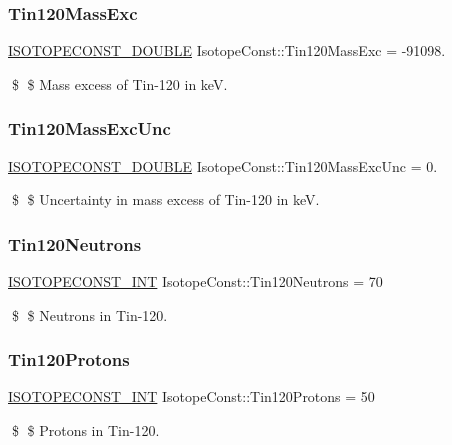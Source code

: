 \subsubsection{\texorpdfstring{Tin120\+Mass\+Exc}{Tin120MassExc}}
{\footnotesize\ttfamily \mbox{\hyperlink{group___isotope_const-_macros_ga8f45a7272ce02c0b4c65c44636ed719a}{I\+S\+O\+T\+O\+P\+E\+C\+O\+N\+S\+T\+\_\+\+D\+O\+U\+B\+LE}} Isotope\+Const\+::\+Tin120\+Mass\+Exc = -\/91098.}

\$ \$ Mass excess of Tin-\/120 in keV. \mbox{\label{group___isotope_const-_tin-_sn120_ga3a619c52223905068be133a5ba8a5cce}} 
\subsubsection{\texorpdfstring{Tin120\+Mass\+Exc\+Unc}{Tin120MassExcUnc}}
{\footnotesize\ttfamily \mbox{\hyperlink{group___isotope_const-_macros_ga8f45a7272ce02c0b4c65c44636ed719a}{I\+S\+O\+T\+O\+P\+E\+C\+O\+N\+S\+T\+\_\+\+D\+O\+U\+B\+LE}} Isotope\+Const\+::\+Tin120\+Mass\+Exc\+Unc = 0.}

\$ \$ Uncertainty in mass excess of Tin-\/120 in keV. \mbox{\label{group___isotope_const-_tin-_sn120_ga36d9ff5de2eb9184aceeff30debefafb}} 
\subsubsection{\texorpdfstring{Tin120\+Neutrons}{Tin120Neutrons}}
{\footnotesize\ttfamily \mbox{\hyperlink{group___isotope_const-_macros_ga5f18360b3e99483a35c32d789e62621c}{I\+S\+O\+T\+O\+P\+E\+C\+O\+N\+S\+T\+\_\+\+I\+NT}} Isotope\+Const\+::\+Tin120\+Neutrons = 70}

\$ \$ Neutrons in Tin-\/120. \mbox{\label{group___isotope_const-_tin-_sn120_ga727db86d9316a1e7d84bfd7e0e42b088}} 
\subsubsection{\texorpdfstring{Tin120\+Protons}{Tin120Protons}}
{\footnotesize\ttfamily \mbox{\hyperlink{group___isotope_const-_macros_ga5f18360b3e99483a35c32d789e62621c}{I\+S\+O\+T\+O\+P\+E\+C\+O\+N\+S\+T\+\_\+\+I\+NT}} Isotope\+Const\+::\+Tin120\+Protons = 50}

\$ \$ Protons in Tin-\/120. 